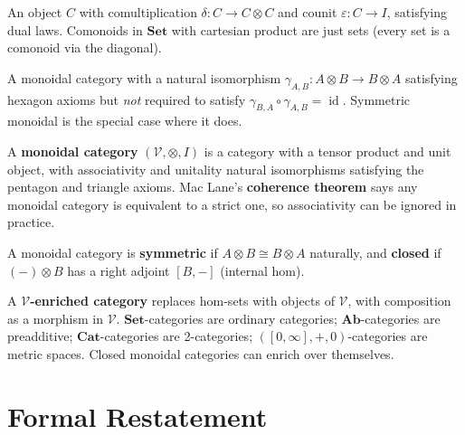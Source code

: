 \begin{exercisesbox}
\begin{qa}
       {An object $C$ with comultiplication $\delta : C \to C \otimes C$ and
        counit $\varepsilon : C \to I$, satisfying dual laws. Comonoids in
        $\mathbf{Set}$ with cartesian product are just sets (every set is a
        comonoid via the diagonal).}

       {A monoidal category with a natural isomorphism $\gamma_{A,B} : A\otimes B \to B\otimes A$
        satisfying hexagon axioms but \emph{not} required to satisfy $\gamma_{B,A} \circ \gamma_{A,B} = \operatorname{id}$.
        Symmetric monoidal is the special case where it does.}
\end{qa}
\end{exercisesbox}

\begin{summarybox}
A \textbf{monoidal category} $(\mathcal{V}, \otimes, I)$ is a category with a
tensor product and unit object, with associativity and unitality natural
isomorphisms satisfying the pentagon and triangle axioms. Mac Lane's
\textbf{coherence theorem} says any monoidal category is equivalent to a strict
one, so associativity can be ignored in practice.

A monoidal category is \textbf{symmetric} if $A \otimes B \cong B \otimes A$
naturally, and \textbf{closed} if $(-) \otimes B$ has a right adjoint
$[B, -]$ (internal hom).

A \textbf{$\mathcal{V}$-enriched category} replaces hom-sets with objects
of $\mathcal{V}$, with composition as a morphism in $\mathcal{V}$. $\mathbf{Set}$-categories
are ordinary categories; $\mathbf{Ab}$-categories are preadditive; $\mathbf{Cat}$-categories
are 2-categories; $([0,\infty], +, 0)$-categories are metric spaces. Closed
monoidal categories can enrich over themselves.
\end{summarybox}

\section{Formal Restatement}

